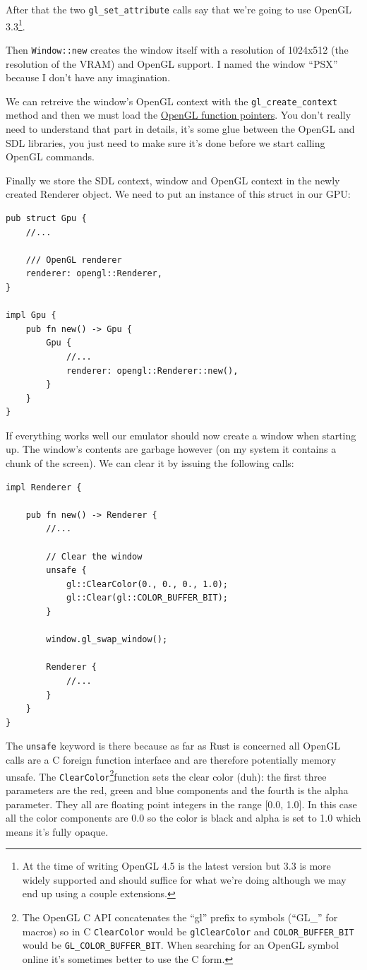 \documentclass[a4paper]{article}
\newcommand{\code}[1] {\texttt{#1}}
\begin{document}
After that the two \code{gl\_set\_attribute} calls say that we're
going to use OpenGL 3.3\footnote{At the time of writing OpenGL 4.5 is
  the latest version but 3.3 is more widely supported and should
  suffice for what we're doing although we may end up using a couple
  extensions.}.

Then \code{Window::new} creates the window itself with a resolution of
1024x512 (the resolution of the VRAM) and OpenGL support. I named the
window ``PSX'' because I don't have any imagination.

We can retreive the window's OpenGL context with the
\code{gl\_create\_context} method and then we must load the
\href{https://www.opengl.org/wiki/Load_OpenGL_Functions}{OpenGL
  function pointers}. You don't really need to understand that part in
details, it's some glue between the OpenGL and SDL libraries, you just
need to make sure it's done before we start calling OpenGL commands.

Finally we store the SDL context, window and OpenGL context in the
newly created Renderer object. We need to put an instance of this
struct in our GPU:

\begin{lstlisting}
pub struct Gpu {
    //...

    /// OpenGL renderer
    renderer: opengl::Renderer,
}

impl Gpu {
    pub fn new() -> Gpu {
        Gpu {
            //...
            renderer: opengl::Renderer::new(),
        }
    }
}
\end{lstlisting}

If everything works well our emulator should now create a window when
starting up. The window's contents are garbage however (on my system
it contains a chunk of the screen). We can clear it by issuing the
following calls:

\begin{lstlisting}
impl Renderer {

    pub fn new() -> Renderer {
        //...

        // Clear the window
        unsafe {
            gl::ClearColor(0., 0., 0., 1.0);
            gl::Clear(gl::COLOR_BUFFER_BIT);
        }

        window.gl_swap_window();

        Renderer {
            //...
        }
    }
}
\end{lstlisting}

The \code{unsafe} keyword is there because as far as Rust is concerned
all OpenGL calls are a C foreign function interface and are therefore
potentially memory unsafe. The \code{ClearColor}\footnote{The OpenGL C
  API concatenates the ``gl'' prefix to symbols (``GL\_'' for macros)
  so in C \code{ClearColor} would be \code{glClearColor} and
  \code{COLOR\_BUFFER\_BIT} would be
  \code{GL\_COLOR\_BUFFER\_BIT}. When searching for an OpenGL symbol
  online it's sometimes better to use the C form.}function sets the
clear color (duh): the first three parameters are the red, green and
blue components and the fourth is the alpha parameter. They all are
floating point integers in the range [0.0, 1.0]. In this case all the
color components are 0.0 so the color is black and alpha is set to 1.0
which means it's fully opaque.
\end{document}
